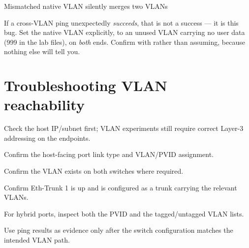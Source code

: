 \begin{netfigure}{Mismatched native VLAN silently merges two VLANs}
\end{netfigure}

\begin{pitfall}
If a cross-VLAN ping unexpectedly \emph{succeeds}, that is not a success --- it is this bug. Set the native VLAN explicitly, to an unused VLAN carrying no user data (999 in the lab files), on \emph{both} ends. Confirm with  rather than assuming, because nothing else will tell you.
\end{pitfall}

\section{Troubleshooting VLAN reachability}
\begin{netsteps}
\item Check the host IP/subnet first; VLAN experiments still require correct Layer-3 addressing on the endpoints.
\item Confirm the host-facing port link type and VLAN/PVID assignment.
\item Confirm the VLAN exists on both switches where required.
\item Confirm Eth-Trunk 1 is up and is configured as a trunk carrying the relevant VLANs.
\item For hybrid ports, inspect both the PVID and the tagged/untagged VLAN lists.
\item Use ping results as evidence only after the switch configuration matches the intended VLAN path.
\end{netsteps}

